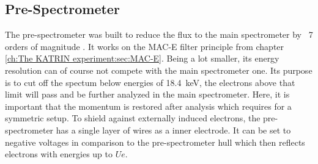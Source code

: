       \subsection{Pre-Spectrometer}
      \label{ch:The KATRIN experiment:sec:Experimental setup:subsec:PreSpectrometer}
      The pre-spectrometer was built to reduce the flux to the main spectrometer by ~7 orders of magnitude \cite{statusPSWolf}. It works on the MAC-E filter principle from chapter \ref{ch:The KATRIN experiment:sec:MAC-E}. Being a lot smaller, its energy resolution can of course not compete with the main spectrometer one. Its purpose is to cut off the spectum below energies of \SI{18.4}{\kilo\electronvolt}, the electrons above that limit will pass and be further analyzed in the main spectrometer. Here, it is important that the momentum is restored after analysis which requires for a symmetric setup. To shield against externally induced electrons, the pre-spectrometer has a single layer of wires as a inner electrode. It can be set to negative voltages in comparison to the pre-spectrometer hull which then reflects electrons with energies up to $Ue$.
      
